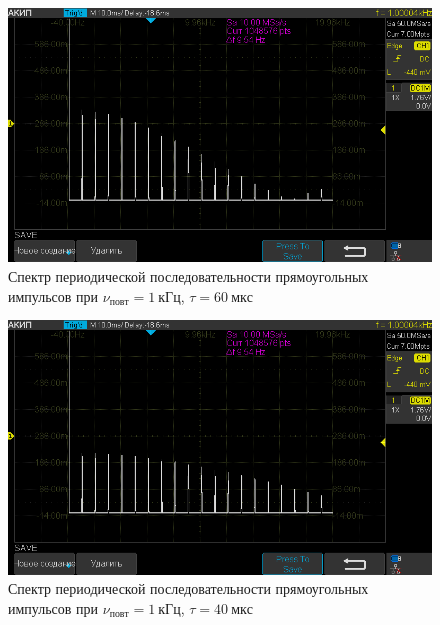 \documentclass[a4paper, 12pt]{article}
\begin{document}
\begin{figure}[h!]
\begin{flushleft}
    \includegraphics[scale=0.5]{AKIP0005.png}
\end{flushleft}
\caption{Спектр периодической последовательности прямоугольных импульсов при \newline $\nu_{повт} = 1~кГц$, $\tau = 60~мкс$}
\label{ris11}
\end{figure}

\begin{figure}[h!]
\begin{flushleft}
    \includegraphics[scale=0.5]{AKIP0006.png}
\end{flushleft}
\caption{Спектр периодической последовательности прямоугольных импульсов при \newline $\nu_{повт} = 1~кГц$, $\tau = 40~мкс$}
\label{ris12}
\end{figure}
\end{document}
